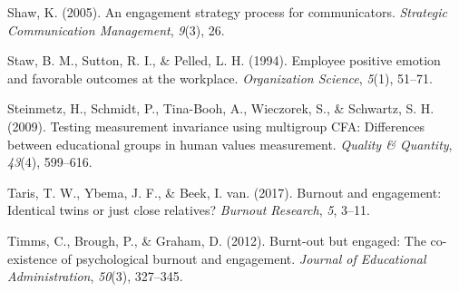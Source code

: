 \documentclass[
  man]{apa7}
\newlength{\cslhangindent}
\newlength{\cslentryspacingunit} %
\newenvironment{CSLReferences}[2] %
 {%
  \setlength{\parindent}{0pt}
  \ifodd #1
  \let\oldpar\par
  \def\par{\hangindent=\cslhangindent\oldpar}
  \fi
  \setlength{\parskip}{#2\cslentryspacingunit}
 }%
 {}
\begin{document}
\begin{CSLReferences}{1}{0}
\leavevmode{}%
Shaw, K. (2005). An engagement strategy process for communicators. \emph{Strategic Communication Management}, \emph{9}(3), 26.

\leavevmode{}%
Staw, B. M., Sutton, R. I., \& Pelled, L. H. (1994). Employee positive emotion and favorable outcomes at the workplace. \emph{Organization Science}, \emph{5}(1), 51--71.

\leavevmode{}%
Steinmetz, H., Schmidt, P., Tina-Booh, A., Wieczorek, S., \& Schwartz, S. H. (2009). Testing measurement invariance using multigroup CFA: Differences between educational groups in human values measurement. \emph{Quality \& Quantity}, \emph{43}(4), 599--616.

\leavevmode{}%
Taris, T. W., Ybema, J. F., \& Beek, I. van. (2017). Burnout and engagement: Identical twins or just close relatives? \emph{Burnout Research}, \emph{5}, 3--11.

\leavevmode{}%
Timms, C., Brough, P., \& Graham, D. (2012). Burnt-out but engaged: The co-existence of psychological burnout and engagement. \emph{Journal of Educational Administration}, \emph{50}(3), 327--345.

\end{CSLReferences}

\endgroup
\end{document}
